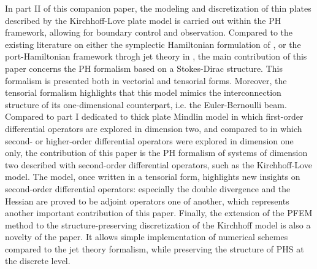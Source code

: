 \documentclass[preprint,12pt]{elsarticle}
\begin{document}
In part II of this companion paper, the modeling and discretization of thin plates described by the Kirchhoff-Love plate model is carried out within the PH framework, allowing for boundary control and observation. Compared to the existing literature on either the symplectic Hamiltonian formulation of  \cite{LI2016984,LI2018310}, or the port-Hamiltonian framework throgh jet theory in \cite{SchobertMindlin,SCHOBERL2015610}, the main contribution of this paper concerns the PH formalism based on a Stokes-Dirac structure. This formalism is presented both in vectorial and tensorial forms.  Moreover, the tensorial formalism \cite[Chapter~16]{Grinfield} highlights that this model mimics the interconnection structure of its one-dimensional counterpart, i.e. the Euler-Bernoulli beam. Compared to part I dedicated to thick plate Mindlin model in which first-order differential operators are explored in dimension two, and compared to \cite{LeGorrec2005} in which second-  or higher-order differential operators were explored in dimension one only, the contribution of this paper is the PH formalism of systems of dimension two described with second-order  differential operators, such as the Kirchhoff-Love  model. 
The model, once written in a tensorial form, highlights new insights on second-order differential operators: especially the double divergence and the Hessian are proved to be adjoint operators one of another, which represents another important contribution of this paper.
Finally, the extension of the PFEM method  to the structure-preserving discretization of the Kirchhoff model  is also a novelty of the paper. It allows simple implementation of numerical schemes compared to the jet theory formalism, while preserving the structure of PHS at the discrete level. 
\end{document}
